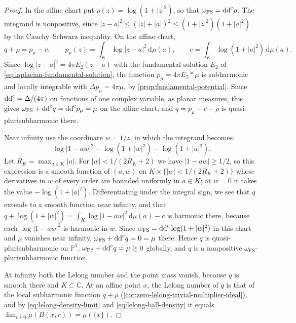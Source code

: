 \begin{proof}
In the affine chart put $\rho(z)=\log(1+|z|^2)$, so that $\omega_{\mathrm{FS}}=\mathrm{dd}^{\mathrm{c}}\rho$. The integrand is nonpositive, since $|z-a|^2\leq(|z|+|a|)^2\leq(1+|z|^2)(1+|a|^2)$ by the Cauchy--Schwarz inequality. On the affine chart,
\[
 q+\rho=p_\mu-c,\qquad p_\mu(z)=\int_K\log|z-a|^2\,\mathrm d\mu(a),\qquad c=\int_K\log(1+|a|^2)\,\mathrm d\mu(a).
\]
Since $\log|z-a|^2=4\pi E_2(z-a)$ with the fundamental solution $E_2$ of \eqref{eq:laplacian-fundamental-solution}, the function $p_\mu=4\pi E_2*\mu$ is subharmonic and locally integrable with $\Delta p_\mu=4\pi\mu$, by \cref{prop:fundamental-potential}. Since $\mathrm{dd}^{\mathrm{c}}=\Delta/(4\pi)$ on functions of one complex variable, as planar measures, this gives $\omega_{\mathrm{FS}}+\mathrm{dd}^{\mathrm{c}} q=\mathrm{dd}^{\mathrm{c}} p_\mu=\mu$ on the affine chart, and $q=p_\mu-c-\rho$ is quasi-plurisubharmonic there.

Near infinity use the coordinate $w=1/z$, in which the integrand becomes
\[
 \log|1-aw|^2-\log(1+|w|^2)-\log(1+|a|^2).
\]
Let $R_K=\max_{a\in K}|a|$. For $|w|<1/(2R_K+2)$ we have $|1-aw|\geq1/2$, so this expression is a smooth function of $(a,w)$ on $K\times\{|w|<1/(2R_K+2)\}$ whose derivatives in $w$ of every order are bounded uniformly in $a\in K$; at $w=0$ it takes the value $-\log(1+|a|^2)$. Differentiating under the integral sign, we see that $q$ extends to a smooth function near infinity, and that $q+\log(1+|w|^2)=\int_K\log|1-aw|^2\,\mathrm d\mu(a)-c$ is harmonic there, because each $\log|1-aw|^2$ is harmonic in $w$. Since $\omega_{\mathrm{FS}}=\mathrm{dd}^{\mathrm{c}}\log(1+|w|^2)$ in this chart and $\mu$ vanishes near infinity, $\omega_{\mathrm{FS}}+\mathrm{dd}^{\mathrm{c}} q=0=\mu$ there. Hence $q$ is quasi-plurisubharmonic on $\mathbb P^1$, $\omega_{\mathrm{FS}}+\mathrm{dd}^{\mathrm{c}} q=\mu\geq0$ globally, and $q$ is a nonpositive $\omega_{\mathrm{FS}}$-plurisubharmonic function.

At infinity both the Lelong number and the point mass vanish, because $q$ is smooth there and $K\subset\mathbb C$. At an affine point $x$, the Lelong number of $q$ is that of the local subharmonic function $q+\rho$ (\cref{cor:zero-lelong-trivial-multiplier-ideal}), and by \eqref{eq:lelong-density-limit} and \eqref{eq:lelong-ball-density} it equals $\lim_{r\downarrow0}\mu(B(x,r))=\mu(\{x\})$.
\end{proof}

